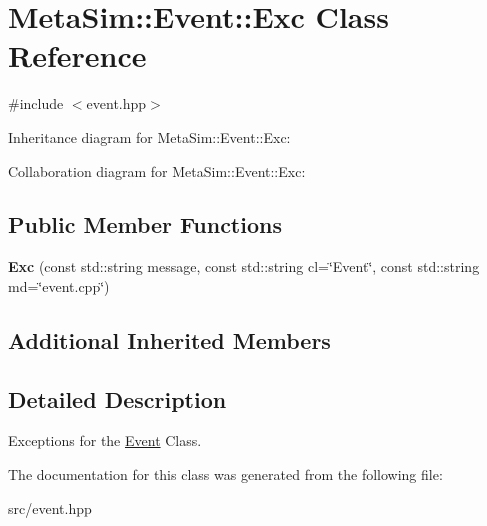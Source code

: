 \hypertarget{classMetaSim_1_1Event_1_1Exc}{}\section{Meta\+Sim\+:\+:Event\+:\+:Exc Class Reference}
\label{classMetaSim_1_1Event_1_1Exc}


{\ttfamily \#include $<$event.\+hpp$>$}



Inheritance diagram for Meta\+Sim\+:\+:Event\+:\+:Exc\+:


Collaboration diagram for Meta\+Sim\+:\+:Event\+:\+:Exc\+:
\subsection*{Public Member Functions}
\begin{DoxyCompactItemize}
\item 
{\bfseries Exc} (const std\+::string message, const std\+::string cl=\char`\"{}Event\char`\"{}, const std\+::string md=\char`\"{}event.\+cpp\char`\"{})\hypertarget{classMetaSim_1_1Event_1_1Exc_a263d84c38437c5269281c77bba3e4dca}{}\label{classMetaSim_1_1Event_1_1Exc_a263d84c38437c5269281c77bba3e4dca}

\end{DoxyCompactItemize}
\subsection*{Additional Inherited Members}


\subsection{Detailed Description}
Exceptions for the \hyperlink{classMetaSim_1_1Event}{Event} Class. 

The documentation for this class was generated from the following file\+:\begin{DoxyCompactItemize}
\item 
src/event.\+hpp\end{DoxyCompactItemize}

